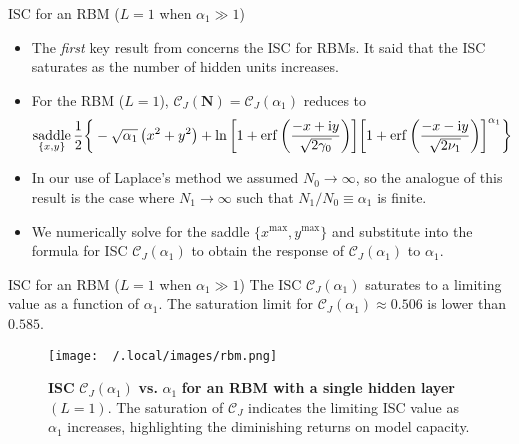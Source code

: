 \documentclass[8pt]{beamer}
\begin{document}
\begin{frame}[label={sec:org003379d}]{ISC for an RBM (\(L=1\) when \(\alpha_1 \gg 1\))}
\begin{itemize}
\item The \emph{first} key result from \cite{bansal2018using} concerns the ISC for RBMs. It said that the ISC saturates as the number of hidden units increases.
\linebreak
\item For the RBM (\(L=1\)), \(\mathcal{C}_{J} (\boldsymbol{N}) = \mathcal{C}_{J} (\alpha_{1})\) reduces to
\[
\underset{\{x, y\}}{\operatorname{saddle}} \thinspace \frac{1}{2} \bigg \{- \sqrt{\alpha_{1}} \thinspace \big(x^{2} + y^{2} \big) + \ln \bigg [1 + \operatorname{erf} \bigg(\frac{- x + \mathrm{i} y}{\sqrt{2 \gamma_{0}}} \bigg) \bigg] \bigg [1 + \operatorname{erf} \bigg(\frac{- x - \mathrm{i} y}{\sqrt{2 \nu_{1}}} \bigg) \bigg ]^{\alpha_{1}} \bigg \}
  \]
\linebreak
\item In our use of Laplace's method we assumed \(N_{0} \to \infty\), so the analogue of this result is the case where \(N_{1} \to \infty\) such that \(N_{1} / N_{0} \equiv \alpha_{1}\) is finite.
\linebreak
\item We numerically solve for the saddle \(\{x^{\text{max}}, y^{\text{max}}\}\) and substitute into the formula for ISC  \(\mathcal{C}_{J} (\alpha_{1})\) to obtain the response of \(\mathcal{C}_{J} (\alpha_{1})\) to \(\alpha_{1}\).
\end{itemize}
\end{frame}

\begin{frame}[label={sec:org72bd224}]{ISC for an RBM (\(L=1\) when \(\alpha_1 \gg 1\))}
The ISC \(\mathcal{C}_{J} (\alpha_{1})\) saturates to a limiting value as a function of \(\alpha_{1}\). The saturation limit for \(\mathcal{C}_{J} (\alpha_{1}) \approx 0.506\) is lower than \(0.585\).

\begin{figure}[htbp]
  \centering
  \texttt{[image: ~/.local/images/rbm.png]}
  \caption{\textbf{ISC} \(\mathcal{C}_{J} (\alpha_{1})\) \textbf{vs.} \(\alpha_{1}\) \textbf{for an RBM with a single hidden layer} \((L=1)\). The saturation of \(\mathcal{C}_{J}\) indicates the limiting ISC value as \(\alpha_{1}\) increases, highlighting the diminishing returns on model capacity.}
  \label{fig:sub1}
\end{figure}
\end{frame}
\end{document}
